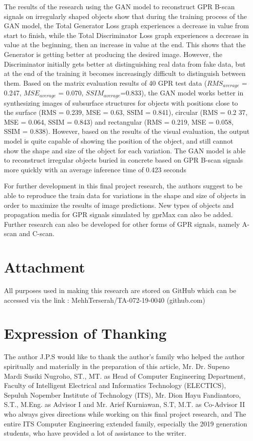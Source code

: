 \documentclass[conference]{IEEEtran}
\begin{document}
The results of the research using the GAN model to reconstruct GPR B-scan signals on irregularly shaped objects show that during the training process of the GAN model, the Total Generator Loss graph experiences a decrease in value from start to finish, while the Total Discriminator Loss graph experiences a decrease in value at the beginning, then an increase in value at the end.
This shows that the Generator is getting better at producing the desired image. However, the Discriminator initially gets better at distinguishing real data from fake data, but at the end of the training it becomes increasingly difficult to distinguish between them.
Based on the matrix evaluation results of 40 GPR test data ($RMS_{average}$ = 0.247, $MSE_{average}$ = 0.070, $SSIM_{average}$=0.833), the GAN model works better in synthesizing images of subsurface structures for objects with positions close to the surface (RMS = 0.239, MSE = 0.63, SSIM = 0.841), circular (RMS = 0.2 37, MSE = 0.064, SSIM = 0.843) and rectangular (RMS = 0.219, MSE = 0.058, SSIM = 0.838).
However, based on the results of the visual evaluation, the output model is quite capable of showing the position of the object, and still cannot show the shape and size of the object for each variation.
The GAN model is able to reconstruct irregular objects buried in concrete based on GPR B-scan signals more quickly with an average inference time of 0.423 seconds

For further development in this final project research, the authors suggest to be able to reproduce the train data for variations in the shape and size of objects in order to maximize the results of image predictions.
New types of objects and propagation media for GPR signals simulated by gprMax can also be added.
Further research can also be developed for other forms of GPR signals, namely A-scan and C-scan.

\section{Attachment}

All purposes used in making this research are stored on GitHub which can be accessed via the link : MehhTerserah/TA-072-19-0040 (github.com)

\section{Expression of Thanking}

The author J.P.S would like to thank the author's family who helped the author spiritually and materially in the preparation of this article,
Mr. Dr. Supeno Mardi Susiki Nugroho, ST., MT. as Head of Computer Engineering Department, Faculty of Intelligent Electrical and Informatics Technology (ELECTICS), Sepuluh Nopember Institute of Technology (ITS),
Mr. Dion Hayu Fandiantoro, S.T., M.Eng. as Advisor I and Mr. Arief Kurniawan, S.T, M.T. as Co-Advisor II who always gives directions while working on this final project research,
and The entire ITS Computer Engineering extended family, especially the 2019 generation students, who have provided a lot of assistance to the writer.
\end{document}
